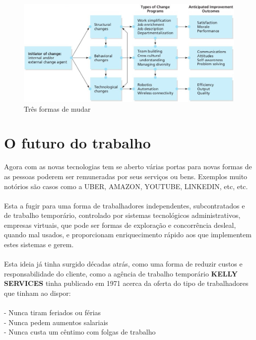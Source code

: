 \begin{figure}[H]
	\centering
	\includegraphics[scale=0.52]{./image/Change/Three_Change_Approaches.jpg}
	\caption{Três formas de mudar \cite{book_6}}
\end{figure}
\newpage
\section{O futuro do trabalho}
\qquad Agora com as novas tecnologias tem se aberto várias portas para novas formas de as pessoas poderem ser remuneradas por seus serviços ou bens. Exemplos muito notórios são casos como a UBER, AMAZON, YOUTUBE, LINKEDIN, etc, etc.\\
\\
Esta a fugir para uma forma de trabalhadores independentes, subcontratados e de trabalho temporário, controlado por sistemas tecnológicos administrativos, empresas virtuais, que pode ser formas de exploração e concorrência desleal, quando mal usados, e proporcionam enriquecimento rápido aos que implementem estes sistemas e gerem. \\
\\
Esta ideia já tinha surgido décadas atrás, como uma forma de reduzir custos e responsabilidade do cliente, como a agência de trabalho temporário \textbf{KELLY SERVICES} tinha publicado em 1971 acerca da oferta do tipo de trabalhadores que tinham ao dispor: \cite{book_11} \\
\\
\hspace*{.5cm} - Nunca tiram feriados ou férias\\
\hspace*{.5cm} - Nunca pedem aumentos salariais\\
\hspace*{.5cm} - Nunca custa um cêntimo com folgas de trabalho\\
